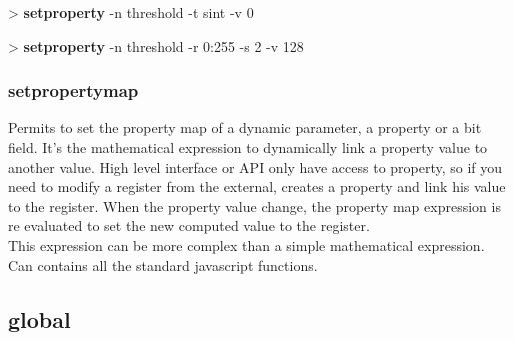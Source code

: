 \documentclass[10pt,a4paper]{article}
\begin{document}
\begin{sampletitle}
> \textbf{\tool{} setproperty} -n threshold -t sint -v 0
\end{sampletitle}

\begin{sampletitle}
> \textbf{\tool{} setproperty} -n threshold -r 0:255 -s 2 -v 128
\end{sampletitle}

\subsubsection{setpropertymap}

Permits to set the property map of a dynamic parameter, a property or a bit field. It's the mathematical expression to dynamically link a property value to another value. High level interface or API only have access to property, so if you need to modify a register from the external, creates a property and link his value to the register. When the property value change, the property map expression is re evaluated to set the new computed value to the register.\\

This expression can be more complex than a simple mathematical expression. Can contains all the standard javascript functions.\\


\subsection{global}
\end{document}
